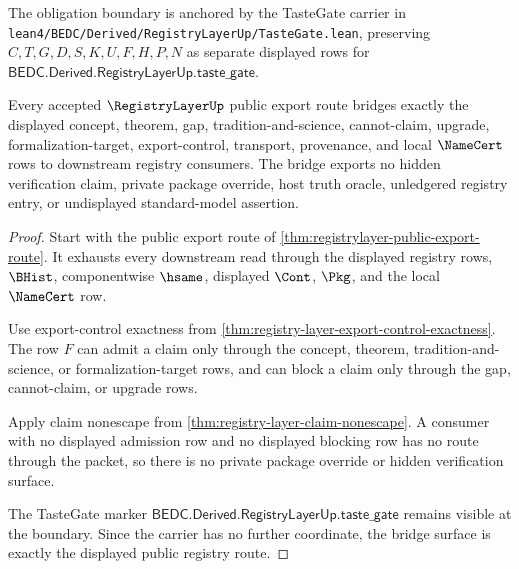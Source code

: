 The obligation boundary is anchored by the TasteGate carrier in \texttt{lean4/BEDC/Derived/RegistryLayerUp/TasteGate.lean}, preserving $C,T,G,D,S,K,U,F,H,P,N$ as separate displayed rows for $\mathsf{BEDC.Derived.RegistryLayerUp.taste\_gate}$.

\begin{theorem}
\label{thm:registrylayer-bridge-surface}
Every accepted $\RegistryLayerUp$ public export route bridges exactly the displayed concept, theorem, gap, tradition-and-science, cannot-claim, upgrade, formalization-target, export-control, transport, provenance, and local $\NameCert$ rows to downstream registry consumers. The bridge exports no hidden verification claim, private package override, host truth oracle, unledgered registry entry, or undisplayed standard-model assertion.
\end{theorem}
\begin{proof}
Start with the public export route of \autoref{thm:registrylayer-public-export-route}. It exhausts every downstream read through the displayed registry rows, $\BHist$, componentwise $\hsame$, displayed $\Cont$, $\Pkg$, and the local $\NameCert$ row.

Use export-control exactness from \autoref{thm:registry-layer-export-control-exactness}. The row $F$ can admit a claim only through the concept, theorem, tradition-and-science, or formalization-target rows, and can block a claim only through the gap, cannot-claim, or upgrade rows.

Apply claim nonescape from \autoref{thm:registry-layer-claim-nonescape}. A consumer with no displayed admission row and no displayed blocking row has no route through the packet, so there is no private package override or hidden verification surface.

The TasteGate marker $\mathsf{BEDC.Derived.RegistryLayerUp.taste\_gate}$ remains visible at the boundary. Since the carrier has no further coordinate, the bridge surface is exactly the displayed public registry route.
\end{proof}



